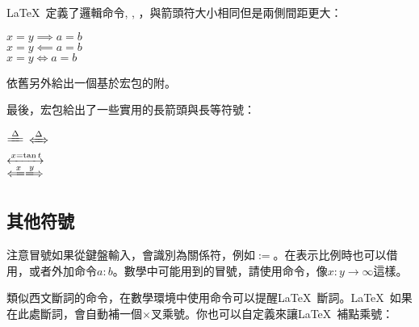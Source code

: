 \LaTeX\ 定義了邏輯命令, , ，與箭頭符大小相同但是兩側間距更大：
\begin{codeshow}
$x=y \implies a=b$\\
$x=y \impliedby a=b$\\
$x=y \iff a=b$
\end{codeshow}

依舊另外給出一個基於宏包的附。
\begin{table}[!htb]
\centering
\caption{amssymb箭頭}
\label{tab:amsarrow}
\renewcommand\arraystretch{1}
\end{table}

最後，宏包給出了一些實用的長箭頭與長等符號：

\begin{codeshow}
$\xlongequal{\Delta}$\quad
$\xLeftrightarrow{\Delta}$\\
$\xleftrightarrow{x=\tan t}$\\
$\xLongleftarrow{x} \xLongrightarrow{y}$
\end{codeshow}

\subsection{其他符號}
注意冒號如果從鍵盤輸入，會識別為關係符，例如$:=$。在表示比例時也可以借用，或者外加命令$a\mathbin{:}b$。數學中可能用到的冒號，請使用命令，像$x\colon y\to\infty$這樣。

類似西文斷詞的\latexline{-}命令，在數學環境中使用\latexline{*}命令可以提醒\LaTeX\ 斷詞。\LaTeX\ 如果在此處斷詞，會自動補一個$\times$叉乘號。你也可以自定義來讓\LaTeX\ 補點乘號：
\begin{latex}
\renewcommand{\*}{\discretionary{\,\mbox{$\cdot$}}{}{}}
\end{latex}

